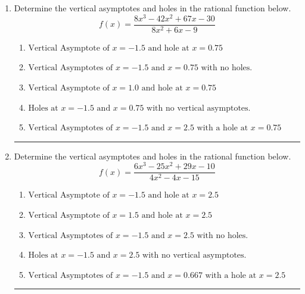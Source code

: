 \documentclass[14pt]{extbook}
\newcommand{\litem}[1]{\item#1\hspace*{-1cm}\rule{\textwidth}{0.4pt}}
\begin{document}
\begin{enumerate}
{\begin{enumerate}[label=\Alph*.]
\end{enumerate} }
\litem{
Determine the vertical asymptotes and holes in the rational function below.\[ f(x) = \frac{8x^{3} -42 x^{2} +67 x -30}{8x^{2} +6 x -9} \]\begin{enumerate}[label=\Alph*.]
\item \( \text{Vertical Asymptote of } x = -1.5 \text{ and hole at } x = 0.75 \)
\item \( \text{Vertical Asymptotes of } x = -1.5 \text{ and } x = 0.75 \text{ with no holes.} \)
\item \( \text{Vertical Asymptote of } x = 1.0 \text{ and hole at } x = 0.75 \)
\item \( \text{Holes at } x = -1.5 \text{ and } x = 0.75 \text{ with no vertical asymptotes.} \)
\item \( \text{Vertical Asymptotes of } x = -1.5 \text{ and } x = 2.5 \text{ with a hole at } x = 0.75 \)

\end{enumerate} }
\litem{
Determine the vertical asymptotes and holes in the rational function below.\[ f(x) = \frac{6x^{3} -25 x^{2} +29 x -10}{4x^{2} -4 x -15} \]\begin{enumerate}[label=\Alph*.]
\item \( \text{Vertical Asymptote of } x = -1.5 \text{ and hole at } x = 2.5 \)
\item \( \text{Vertical Asymptote of } x = 1.5 \text{ and hole at } x = 2.5 \)
\item \( \text{Vertical Asymptotes of } x = -1.5 \text{ and } x = 2.5 \text{ with no holes.} \)
\item \( \text{Holes at } x = -1.5 \text{ and } x = 2.5 \text{ with no vertical asymptotes.} \)
\item \( \text{Vertical Asymptotes of } x = -1.5 \text{ and } x = 0.667 \text{ with a hole at } x = 2.5 \)

\end{enumerate} }
\end{enumerate}
\end{document}
